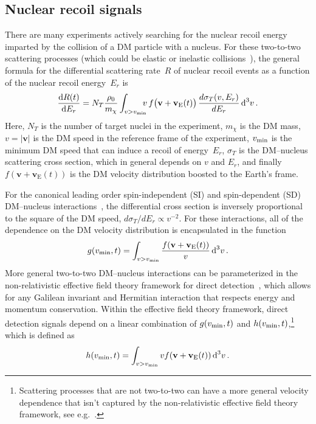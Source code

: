 \documentclass[prd,10pt,twocolumn,showpacs,nofootinbib, aps,superscriptaddress,preprintnumbers]{revtex4-1}
\newcommand{\vmin}{v_{\rm min}}
\begin{document}
\subsection{Nuclear recoil signals}\label{sec:recoils}

There are many experiments actively searching for the nuclear recoil
energy imparted by the collision of a DM particle with a
nucleus.  For these two-to-two scattering processes (which could be
elastic or inelastic collisions~\cite{TuckerSmith:2001hy,Baudis:2013bba,McCabe:2015eia}), 
the general formula for the
differential scattering rate~$R$ of nuclear recoil events as a
function of the nuclear recoil energy~$E_r$ is
%
\begin{equation}\label{eq:eventrate}
 \frac{\textrm{d}R(t)}{\textrm{d}E_r} = N_T \frac{\rho_0}{m_\chi} \int_{v>\vmin} \!\!\!\!  v \, f\big(\mathbf{v}+\mathbf{v}_{\mathrm{E}}(t)\big) \,\frac{d \sigma_T (v,E_r)}{d E_r}  \, \textrm{d}^3v \, .
\end{equation}
%
Here, $N_T$ is the number of target nuclei in the experiment,
$m_{\chi}$ is the DM mass, $v=|\mathbf{v}|$ is the DM speed in the reference frame of the experiment, $v_{\rm{min}}$ is the minimum DM speed
that can induce a recoil of energy~$E_r$, $\sigma_T$ is the
DM--nucleus scattering cross section, which in general depends on $v$
and $E_r$, and finally $ f(\mathbf{v+v_{\mathrm{E}}}(t))$ is the DM velocity
distribution boosted to the Earth's frame.


For the canonical leading order spin-independent (SI) and
spin-dependent (SD) DM--nucleus interactions~\cite{Undagoitia:2015gya}, the differential
cross section is inversely proportional to the square of the DM speed,
$d\sigma_T/dE_r\propto v^{-2}$. For these interactions, all of the
dependence on the DM velocity distribution is encapsulated in the
function
%
 \begin{equation}\label{eq:gvmina}
g(v_{\rm min},t) = \int_{v>\vmin} \frac{f(\textbf{v}+\mathbf{v}_{\mathrm{E}}(t))}{v} \,
\textrm{d}^3 v \, .
 \end{equation}
More general two-to-two DM--nucleus interactions can be parameterized
in the non-relativistic effective field theory framework for direct
detection~\cite{Fitzpatrick:2012ix,Fitzpatrick:2012ib,Anand:2013yka},
which allows for any Galilean invariant and Hermitian interaction that
respects energy and momentum conservation. Within the effective field
theory framework, direct detection signals depend on a linear
combination of $g(v_{\rm min},t) $ and $h(v_{\rm
  min},t)$,\footnote{Scattering processes that are not two-to-two can
  have a more general velocity dependence that isn't captured by the
  non-relativistic effective field theory framework, see
  e.g.~\cite{Kouvaris:2016afs,McCabe:2017rln}.} which is defined as
%
 \begin{equation}\label{eq:gvminb}
h(v_{\rm min},t) = \int_{v>\vmin} v f(\textbf{v}+\mathbf{v}_{\mathrm{E}}(t)) \,
\textrm{d}^3 v \, .
 \end{equation}
 
\end{document}
